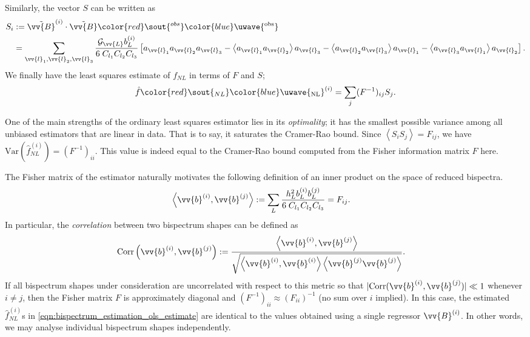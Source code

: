 \documentclass[a4paper,12pt,times,custombib,print,index]{Classes/PhDThesisPSnPDF} %
\providecommand{\DIFadd}[1]{{\protect\color{blue}\uwave{#1}}} %
\providecommand{\DIFdel}[1]{{\protect\color{red}\sout{#1}}}                      %
\providecommand{\DIFaddbegin}{} %
\providecommand{\DIFaddend}{} %
\providecommand{\DIFdelbegin}{} %
\providecommand{\DIFdelend}{} %
\newcommand{\DIFscaledelfig}{0.5}
\newlength{\DIFdelgraphicswidth} %
\newlength{\DIFdelgraphicsheight} %
\newcommand{\DIFaddincludegraphics}[2][]{{\color{blue}\fbox{\DIFOincludegraphics[#1]{#2}}}} %
\newcommand{\DIFdelincludegraphics}[2][]{%
\sbox{\DIFdelgraphicsbox}{\DIFOincludegraphics[#1]{#2}}%
\settoboxwidth{\DIFdelgraphicswidth}{\DIFdelgraphicsbox} %
\settoboxtotalheight{\DIFdelgraphicsheight}{\DIFdelgraphicsbox} %
\scalebox{\DIFscaledelfig}{%
\parbox[b]{\DIFdelgraphicswidth}{\usebox{\DIFdelgraphicsbox}\\[-\baselineskip] \rule{\DIFdelgraphicswidth}{0em}}\llap{\resizebox{\DIFdelgraphicswidth}{\DIFdelgraphicsheight}{%
\setlength{\unitlength}{\DIFdelgraphicswidth}%
\begin{picture}(1,1)%
\thicklines\linethickness{2pt} %
{\color[rgb]{1,0,0}\put(0,0){\framebox(1,1){}}}%
{\color[rgb]{1,0,0}\put(0,0){\line( 1,1){1}}}%
{\color[rgb]{1,0,0}\put(0,1){\line(1,-1){1}}}%
\end{picture}%
}\hspace*{3pt}}} %
} %
\DeclareRobustCommand{\DIFaddbegin}{\DIFOaddbegin \let\includegraphics\DIFaddincludegraphics} %
\DeclareRobustCommand{\DIFaddend}{\DIFOaddend \let\includegraphics\DIFOincludegraphics} %
\DeclareRobustCommand{\DIFdelbegin}{\DIFOdelbegin \let\includegraphics\DIFdelincludegraphics} %
\DeclareRobustCommand{\DIFdelend}{\DIFOaddend \let\includegraphics\DIFOincludegraphics} %
\begin{document}
Similarly, the vector $S$ can be written as
\begin{align}
	S_i &:= \tilde{\vv{B}}^{(i)} \cdot \tilde{\vv{B}}\DIFdelbegin \DIFdel{^{obs} }\DIFdelend \DIFaddbegin \DIFadd{^\text{obs} }\DIFaddend \\
	&= \sum_{\vv{l}_1 , \vv{l}_2 , \vv{l}_3} \frac{\mathcal{G}_{\vv{L}} b^{(i)}_{L}}{6 \; C_{l_1} C_{l_2} C_{l_3}} \left[ a_{\vv{l}_1} a_{\vv{l}_2} a_{\vv{l}_3} - \left< a_{\vv{l}_1} a_{\vv{l}_2} \right> a_{\vv{l}_3} - \left< a_{\vv{l}_2} a_{\vv{l}_3} \right> a_{\vv{l}_1} - \left< a_{\vv{l}_3} a_{\vv{l}_1} \right> a_{\vv{l}_2} \right].
	\label{eqn:bispectrum_estimation_signal}
\end{align}
We finally have the least squares estimate of \DIFdelbegin \DIFdel{$f_{NL}$ }\DIFdelend \DIFaddbegin \DIFadd{$f_\text{NL}$ }\DIFaddend in terms of $F$ and $S$;
\begin{align}
	\hat{f}\DIFdelbegin \DIFdel{_{NL}}\DIFdelend \DIFaddbegin \DIFadd{_\text{NL}}\DIFaddend ^{(i)} = \sum_j (F^{-1})_{ij} S_j. \label{eqn:bispectrum_estimation_ols_estimate}
\end{align}

One of the main strengths of the ordinary least squares estimator lies in its \textit{optimality}; it has the smallest possible variance among all unbiased estimators that are linear in data. That is to say, it saturates the Cramer-Rao bound. Since $\left< S_i S_j \right> = F_{ij}$, we have \DIFdelbegin \DIFdel{$\text{Var}(\hat{f}_{NL}^{(i)}) = (F^{-1})_{ii}$}\DIFdelend \DIFaddbegin \DIFadd{$\text{Var}(\hat{f}_\text{NL}^{(i)}) = (F^{-1})_{ii}$ (no sum over $i$)}\DIFaddend . This value is indeed equal to the Cramer-Rao bound computed from the Fisher information matrix $F$ here.

The Fisher matrix of the estimator naturally motivates the following definition of an inner product on the space of reduced bispectra.
\begin{align}
	\left< \vv{b}^{(i)}, \vv{b}^{(j)} \right> &:= \sum_L \frac{h^2_L b^{(i)}_L b^{(j)}_L}{6 \; C_{l_1} C_{l_2} C_{l_3}}  = F_{ij}.	\label{def:bispectrum_estimation_fisher_inner_product}
\end{align}
In particular, the \textit{correlation} between two bispectrum shapes can be defined as
\begin{align}
	\text{Corr} \left( \vv{b}^{(i)}, \vv{b}^{(j)} \right) &:= \frac{ \left< \vv{b}^{(i)}, \vv{b}^{(j)} \right>}{\sqrt{ \left< \vv{b}^{(i)}, \vv{b}^{(i)} \right> \left< \vv{b}^{(j)} \vv{b}^{(j)} \right> }}.
\end{align}
If all bispectrum shapes under consideration are uncorrelated with respect to this metric so that $| \text{Corr}(\vv{b}^{(i)}, \vv{b}^{(j)}) | \ll 1$ whenever $i \neq j$, then the Fisher matrix $F$ is approximately diagonal and $(F^{-1})_{ii} \approx (F_{ii})^{-1}$ (no sum over $i$ implied). In this case, the estimated \DIFdelbegin \DIFdel{$\hat{f}_{NL}^{(i)}$}\DIFdelend \DIFaddbegin \DIFadd{$\hat{f}_\text{NL}^{(i)}$}\DIFaddend s in \eqref{eqn:bispectrum_estimation_ols_estimate} are identical to the values obtained using a single regressor $\vv{B}^{(i)}$. In other words, we may analyse individual bispectrum shapes independently.
\end{document}
